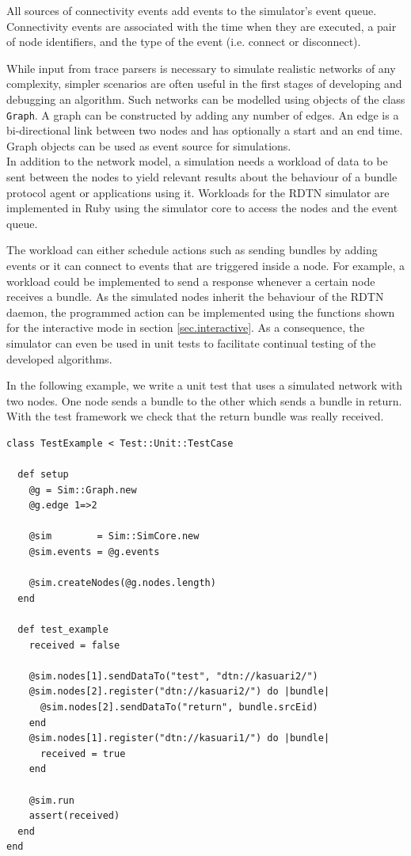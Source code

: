 \documentclass[a4paper]{article}
\begin{document}
All sources of connectivity events add events to the simulator's event queue.
Connectivity events are associated with the time when
they are executed, a pair of node identifiers, and the type of the event (i.e.
connect or disconnect).

While input from trace parsers is necessary to simulate realistic networks of
any complexity, simpler scenarios are often useful in the first stages of
developing and debugging an algorithm. Such networks can be modelled using
objects of the class {\tt Graph}. A graph can be constructed by adding any
number of edges. An edge is a bi-directional link between two nodes and has
optionally a start and an end time. Graph objects can be used as event source
for simulations.\\

In addition to the network model, a simulation needs a workload of data to be
sent between the nodes to yield relevant results about the behaviour of a bundle
protocol agent or applications using it. Workloads for the RDTN simulator are
implemented in Ruby using the simulator core to access the nodes and the event
queue. 

The workload can either schedule actions such as sending bundles by adding
events or it can connect to events that are triggered inside a node. For
example, a workload could be implemented to send a response whenever a certain
node receives a bundle. As the simulated nodes inherit the behaviour of the RDTN
daemon, the programmed action can be implemented using the functions shown for
the interactive mode in section \ref{sec.interactive}. As a consequence, the
simulator can even be used in unit tests to facilitate continual testing of the
developed algorithms.

In the following example, we write a unit test that uses a simulated network
with two nodes. One node sends a bundle to the other which sends a bundle in
return. With the test framework we check that the return bundle was really
received.

\begin{verbatim}
class TestExample < Test::Unit::TestCase

  def setup
    @g = Sim::Graph.new
    @g.edge 1=>2

    @sim        = Sim::SimCore.new
    @sim.events = @g.events

    @sim.createNodes(@g.nodes.length)
  end

  def test_example
    received = false

    @sim.nodes[1].sendDataTo("test", "dtn://kasuari2/")
    @sim.nodes[2].register("dtn://kasuari2/") do |bundle|
      @sim.nodes[2].sendDataTo("return", bundle.srcEid)
    end
    @sim.nodes[1].register("dtn://kasuari1/") do |bundle|
      received = true
    end

    @sim.run
    assert(received)
  end
end
\end{verbatim}
\end{document}
